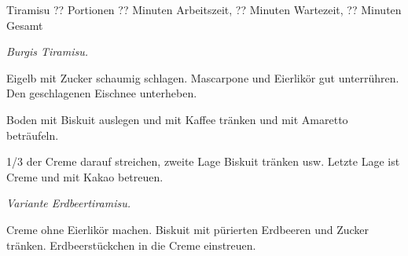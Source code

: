 \begin{recipe}{Tiramisu} {?? Portionen} {?? Minuten Arbeitszeit, ?? Minuten Wartezeit, ?? Minuten Gesamt}

  \freeform{}\textit{Burgis Tiramisu.}


  Eigelb mit Zucker schaumig schlagen.
  Mascarpone und Eierlikör gut unterrühren.
  Den geschlagenen Eischnee unterheben.

  \newstep{}Boden mit Biskuit auslegen und mit Kaffee tränken und mit Amaretto beträufeln.

  \newstep{}1/3 der Creme darauf streichen, zweite Lage Biskuit tränken usw.
  Letzte Lage ist Creme und mit Kakao betreuen.

  \freeform{}\hrulefill{}

  \freeform{}\textit{Variante Erdbeertiramisu.}


  Creme ohne Eierlikör machen.
  Biskuit mit pürierten Erdbeeren und Zucker tränken.
  Erdbeerstückchen in die Creme einstreuen.

  \freeform{}\hrulefill{}

\end{recipe}
